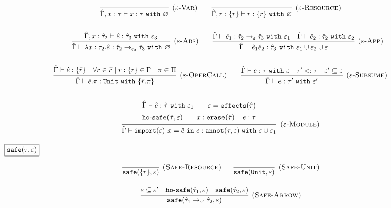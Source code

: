\documentclass{llncs}
\newcommand{\keywadj}[1]{\mathtt{#1}}
\newcommand{\keyw}[1]{\keywadj{#1}~}
\newcommand{\kw}[1]{\keyw{ #1 }}
\newcommand{\kwa}[1]{\keywadj{ #1 }}
\newcommand{\hyphen}{\hbox{-}}
\begin{document}
\[
\begin{array}{c}

\infer[\textsc{($\varepsilon$-Var)}]
	{ \hat \Gamma, x:\tau \vdash x: \tau~\kw{with} \varnothing }
	{}
~~~~~~
\infer[\textsc{($\varepsilon$-Resource)}]
 	{ \hat \Gamma, r: \{ r \} \vdash r : \{ r \}~\kw{with} \varnothing }
 	{}\\[4ex]
 	
~~~~~~
	\infer[\textsc{($\varepsilon$-Abs)}]
	{ \hat \Gamma \vdash \lambda x:\tau_2 . \hat e : \hat \tau_2 \rightarrow_{\varepsilon_3} \hat \tau_3~\kw{with} \varnothing }
	{ \hat \Gamma, x: \hat \tau_2 \vdash \hat e: \hat \tau_3~\kw{with} \varepsilon_3 }
	
	~~~~~~
	
\infer[\textsc{($\varepsilon$-App)}]
	{ \hat \Gamma \vdash \hat e_1 \hat e_2 : \hat \tau_3~\kw{with} \varepsilon_1 \cup \varepsilon_2 \cup \varepsilon  }
	{ \hat \Gamma \vdash \hat e_1: \hat \tau_2 \rightarrow_{\varepsilon} \hat \tau_3~\kw{with} \varepsilon_1 & \hat \Gamma \vdash \hat e_2: \hat \tau_2~\kw{with} \varepsilon_2 } \\[4ex]
	
\infer[\textsc{($\varepsilon$-OperCall)}]
	{ \hat \Gamma \vdash \hat e.\pi: \kw{Unit} \kw{with} \{ \bar r.\pi \} }
	{ \hat \Gamma \vdash \hat e: \{ \bar r \} & \forall r \in \bar r \mid r: \{ r \} \in \Gamma & \pi \in \Pi }
	~~~~~~

\infer[\textsc{($\varepsilon$-Subsume)}]
	{ \hat \Gamma \vdash e: \tau' ~\kw{with} \varepsilon'}
	{ \hat \Gamma \vdash e: \tau ~\kw{with} \varepsilon & \tau' <: \tau & \varepsilon' \subseteq \varepsilon}\\[4ex]

\infer[\textsc{($\varepsilon$-Module)}]
	{ \hat \Gamma \vdash \kwa{import}(\varepsilon)~x = \hat e~\kw{in} e: \kwa{annot}(\tau, \varepsilon)~\kw{with} \varepsilon \cup \varepsilon_1 }
{{\def\arraystretch{1.4}
  \begin{array}{c}
\hat \Gamma \vdash \hat e: \hat \tau~\kw{with} \varepsilon_1
~~~~~~
\varepsilon = \kwa{effects}(\hat \tau) \\
\kwa{ho \hyphen safe}(\hat \tau, \varepsilon) ~~~~~~ x: \kwa{erase}(\hat \tau) \vdash e: \tau
  \end{array}}}
 
\end{array}
\]

\noindent
$\fbox{$\kwa{safe(\tau, \varepsilon)}$}$

\[
\begin{array}{c}

\infer[\textsc{(Safe-Resource)}]
	{\kwa{safe}(\{ \bar r \}, \varepsilon)}
	{}
~~~~~
\infer[\textsc{(Safe-Unit)}]
	{\kwa{safe}(\kwa{Unit}, \varepsilon)}
	{} \\[3ex]

\infer[\textsc{(Safe-Arrow)}]
	{\kwa{safe}(\hat \tau_1 \rightarrow_{\varepsilon'} \hat \tau_2, \varepsilon)}
	{\varepsilon \subseteq \varepsilon' & \kwa{ho \hyphen safe}(\hat \tau_1, \varepsilon) & \kwa{safe}(\hat \tau_2, \varepsilon)} \\[3ex]

\end{array}
\]
\end{document}
